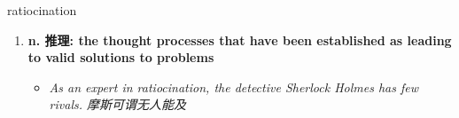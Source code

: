 
\begin{frame}
{\huge ratiocination}
\begin{center}
\begin{enumerate}\Large
  \item \textbf{n. 推理: the thought processes that have been established as leading to valid solutions to problems}
  \begin{itemize}
    \item \em{\Large{As an expert in ratiocination, the detective Sherlock Holmes has few rivals. 摩斯可谓无人能及}}
  \end{itemize}
\end{enumerate}
\end{center}
\end{frame}

